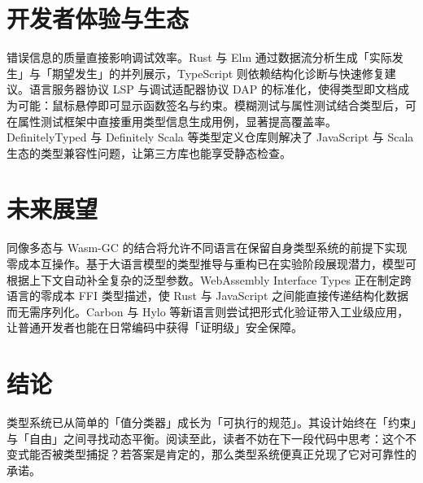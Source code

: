 \chapter{开发者体验与生态}
错误信息的质量直接影响调试效率。Rust 与 Elm 通过数据流分析生成「实际发生」与「期望发生」的并列展示，TypeScript 则依赖结构化诊断与快速修复建议。语言服务器协议 LSP 与调试适配器协议 DAP 的标准化，使得类型即文档成为可能：鼠标悬停即可显示函数签名与约束。模糊测试与属性测试结合类型后，可在属性测试框架中直接重用类型信息生成用例，显著提高覆盖率。DefinitelyTyped 与 Definitely Scala 等类型定义仓库则解决了 JavaScript 与 Scala 生态的类型兼容性问题，让第三方库也能享受静态检查。\par
\chapter{未来展望}
同像多态与 Wasm-GC 的结合将允许不同语言在保留自身类型系统的前提下实现零成本互操作。基于大语言模型的类型推导与重构已在实验阶段展现潜力，模型可根据上下文自动补全复杂的泛型参数。WebAssembly Interface Types 正在制定跨语言的零成本 FFI 类型描述，使 Rust 与 JavaScript 之间能直接传递结构化数据而无需序列化。Carbon 与 Hylo 等新语言则尝试把形式化验证带入工业级应用，让普通开发者也能在日常编码中获得「证明级」安全保障。\par
\chapter{结论}
类型系统已从简单的「值分类器」成长为「可执行的规范」。其设计始终在「约束」与「自由」之间寻找动态平衡。阅读至此，读者不妨在下一段代码中思考：这个不变式能否被类型捕捉？若答案是肯定的，那么类型系统便真正兑现了它对可靠性的承诺。\par
